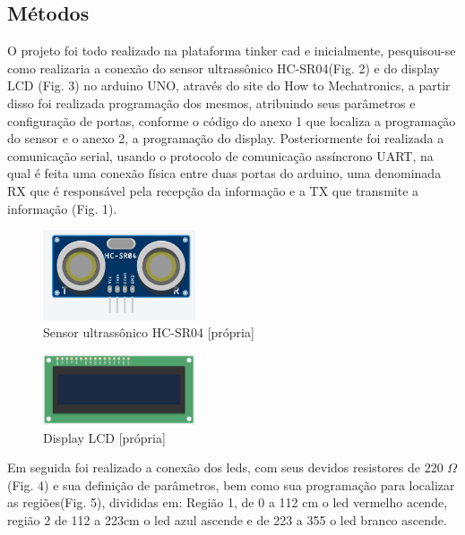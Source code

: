 \documentclass[conference]{IEEEtran}
\begin{document}
\subsection{Métodos}
O projeto foi todo realizado na plataforma tinker cad e inicialmente, pesquisou-se como realizaria a conexão do sensor ultrassônico HC-SR04(Fig. 2) e do display LCD 
(Fig. 3) no arduino UNO, através do site do How to Mechatronics, a partir disso foi realizada programação dos 
mesmos, atribuindo seus parâmetros e configuração de portas, conforme o código do anexo 1 que localiza a programação 
do sensor e  o anexo 2, a programação do display. Posteriormente foi realizada a comunicação serial, usando o 
protocolo de comunicação assíncrono UART, na qual é feita uma conexão física entre duas portas do arduino, uma 
denominada RX que é responsável pela recepção da informação e a TX que transmite a informação (Fig. 1).

 \begin{figure}[htbp]
    \centerline{
        \includegraphics[width=4.5cm]{images/fig3.PNG}
        }
    \caption{Sensor ultrassônico HC-SR04 [própria]}
    \label{figura:fig3}
    \end{figure}

    \begin{figure}[htbp]
        \centerline{
            \includegraphics[width=4.5cm]{images/fig4.PNG}
            }
        \caption{Display LCD [própria]}
        \label{figura:fig4}
        \end{figure}

 Em seguida foi realizado a conexão dos leds, com seus devidos resistores de 220 $\Omega$ (Fig. 4) e sua definição
 de parâmetros, bem como sua programação para localizar as regiões(Fig. 5), divididas em: Região 1, de 0 a 112 cm
 o led vermelho acende, região 2 de 112 a 223cm o led azul ascende e de 223 a 355 o led branco ascende.
\end{document}
